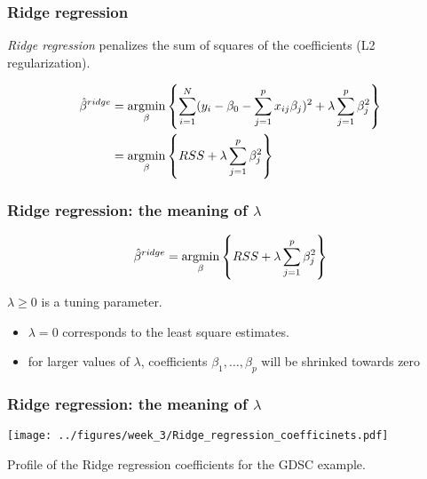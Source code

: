 \documentclass[notes]{beamer}          %
\newcommand{\argmin}{\operatornamewithlimits{argmin}}
\begin{document}
\begin{frame}
\frametitle{Ridge regression}
\textit{Ridge regression} penalizes the sum of squares of the coefficients (L2 regularization). 

\begin{align*}
\hat{\beta}^{ridge} &= \argmin_{\beta} \left\{ \sum_{i=1}^N (y_i - \beta_0 -  \sum_{j=1}^p x_{ij}\beta_j)^2 + \lambda \sum_{j=1}^p \beta_j^2 \right\} \\
& =  \argmin_{\beta} \left\{ RSS + \lambda \sum_{j=1}^p \beta_j^2 \right\}
\end{align*}

\end{frame}


\begin{frame}
\frametitle{Ridge regression: the meaning of $\lambda$}

\begin{equation*}
    \hat{\beta}^{ridge} =  \argmin_{\beta} \left\{ RSS + \lambda \sum_{j=1}^p \beta_j^2 \right\}
\end{equation*}

$\lambda \geq 0$ is a tuning parameter.

\begin{itemize}
    \item $\lambda = 0$ corresponds to the least square estimates.
    \item for larger values of $\lambda$, coefficients $\beta_1, \dots, \beta_p$ will be shrinked towards zero
\end{itemize}
\end{frame}

\begin{frame}
\frametitle{Ridge regression: the meaning of $\lambda$}


\begin{center}

\texttt{[image: ../figures/week\_3/Ridge\_regression\_coefficinets.pdf]}
\end{center}

Profile of the Ridge regression coefficients for the GDSC example.

\end{frame}
\end{document}
